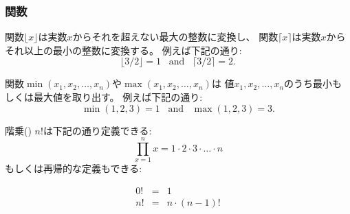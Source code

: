 \begin{comment}
\subsubsection{Functions}

The function $\lfloor x \rfloor$ rounds the number $x$
down to an integer, and the function
$\lceil x \rceil$ rounds the number $x$
up to an integer. For example,
\[ \lfloor 3/2 \rfloor = 1 \hspace{10pt} \textrm{and} \hspace{10pt} \lceil 3/2 \rceil = 2.\]

The functions $\min(x_1,x_2,\ldots,x_n)$
and $\max(x_1,x_2,\ldots,x_n)$
give the smallest and largest of values
$x_1,x_2,\ldots,x_n$.
For example,
\[ \min(1,2,3)=1 \hspace{10pt} \textrm{and} \hspace{10pt} \max(1,2,3)=3.\]
\end{comment}

\subsubsection{関数}

関数$\lfloor x \rfloor$は実数$x$からそれを超えない最大の整数に変換し、
関数$\lceil x \rceil$は実数$x$からそれ以上の最小の整数に変換する。
例えば下記の通り:
\[ \lfloor 3/2 \rfloor = 1 \hspace{10pt} \textrm{and} \hspace{10pt} \lceil 3/2 \rceil = 2.\]

関数$\min(x_1,x_2,\ldots,x_n)$や$\max(x_1,x_2,\ldots,x_n)$は
値$x_1,x_2,\ldots,x_n$のうち最小もしくは最大値を取り出す。
例えば下記の通り:
\[ \min(1,2,3)=1 \hspace{10pt} \textrm{and} \hspace{10pt} \max(1,2,3)=3.\]


\begin{comment}
The \key{factorial} $n!$ can be defined
\[\prod_{x=1}^n x = 1 \cdot 2 \cdot 3 \cdot \ldots \cdot n\]
or recursively
\end{comment}

階乗() $n!$は下記の通り定義できる:
\[\prod_{x=1}^n x = 1 \cdot 2 \cdot 3 \cdot \ldots \cdot n\]
もしくは再帰的な定義もできる:

\[
\begin{array}{lcl}
0! & = & 1 \\
n! & = & n \cdot (n-1)! \\
\end{array}
\]

